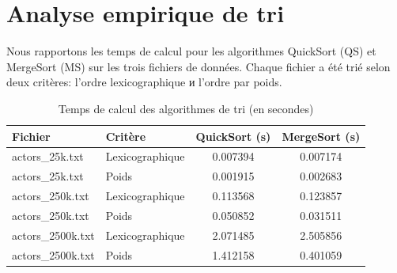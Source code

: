 \section{Analyse empirique de tri}
Nous rapportons les temps de calcul pour les algorithmes
QuickSort (QS) et MergeSort (MS) sur les trois fichiers de données.
Chaque fichier a été trié selon deux critères: l'ordre lexicographique и l'ordre par poids.

\begin{table}[h!]
    \centering
    \caption{Temps de calcul des algorithmes de tri (en secondes)}

    \begin{tabular}{@{}llcc@{}}
        \toprule
            Fichier & Critère & QuickSort (s) & MergeSort (s) \\
        \midrule
            actors\_25k.txt   & Lexicographique & 0.007394 & 0.007174 \\
            actors\_25k.txt   & Poids           & 0.001915 & 0.002683 \\
        \midrule
            actors\_250k.txt  & Lexicographique & 0.113568 & 0.123857 \\
            actors\_250k.txt  & Poids           & 0.050852 & 0.031511 \\
        \midrule
            actors\_2500k.txt & Lexicographique & 2.071485 & 2.505856 \\
            actors\_2500k.txt & Poids           & 1.412158 & 0.401059 \\
        \bottomrule
    \end{tabular}
\end{table}

